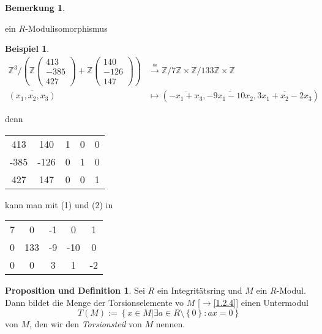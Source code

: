 \documentclass[
twoside=semi,
fontsize=12,
DIV=12, 
cleardoublepage=current,
leqno,
headings=optiontoheadandtoc, 
toc=idx
]{scrbook}
\newcommand{\Z}{\mathbb{Z}}
\newcommand{\brac}[1]{\left( #1 \right)}
\newcommand{\set}[1]{\left\{ #1 \right\}}
\theoremstyle{definition}
\newtheorem{bemerkung}[definition]{Bemerkung}
\newtheorem{beispiel}[definition]{Beispiel}
\newtheorem{prop-def}[definition]{Proposition und Definition}
\begin{document}
\begin{bemerkung}
\begin{enumerate}[(a)]
			ein $R$-Modulisomorphismus
		\end{enumerate}
	
		\begin{beispiel}\label{1.6.7}\hfill
			\begin{align*}
				\Z^3 / \brac{\Z\begin{pmatrix}
						413\\-385\\427
					\end{pmatrix} + \Z\begin{pmatrix}
						140\\-126\\147
				\end{pmatrix}} &\overset{\cong}{\to} \Z/7\Z \times \Z/133\Z \times \Z\\
				\overline{(x_1, x_2, x_3)} &\mapsto (\overline{-x_1+x_3}, \overline{-9x_1-10x_2},\overline{3x_1+x_2-2x_3})
			\end{align*}
			
			denn \begin{tabular}{|cc|ccc|}\hline
			413& 140 & 1 & 0 & 0\\
			-385& -126 & 0 & 1 & 0\\
			427& 147 & 0 & 0 & 1\\\hline
		\end{tabular} kann man mit (1) und (2) in \begin{tabular}{|cc|ccc|}\hline
			7& 0 & -1 & 0 & 1\\
			0& 133 & -9 &-10 & 0\\
			0& 0 & 3 & 1 & -2\\\hline
		\end{tabular}
		
		\end{beispiel}
	\end{bemerkung}

	\begin{prop-def}\label{1.6.8}\hfill\newline
		Sei $R$ ein Integrit\"atsring und $M$ ein $R$-Modul. Dann bildet die Menge der Torsionselemente vo $M$ [$\to$\ref{1.2.4}] einen Untermodul
			\[T(M):= \set{x \in M| \exists a \in R \setminus \set{0}: ax = 0}\]
		von $M$, den wir den \emph{Torsionsteil} von $M$ nennen.
	\end{prop-def}
\end{document}
